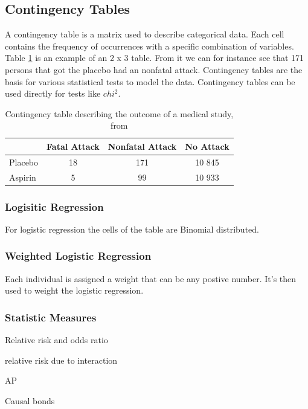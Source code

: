 \documentclass[10pt,a4paper]{article}
\begin{document}
\subsection{Contingency Tables}
A contingency table is a matrix used to describe categorical data. Each cell contains the frequency of occurrences with a specific combination of variables. Table \ref{table:contingency_table} is an example of an 2 x 3 table. From it we can for instance see that 171 persons that got the placebo had an nonfatal attack. Contingency tables are the basis for various statistical tests to model the data. Contingency tables can be used directly for tests like $chi^2$.\cite{agresti_categorical}

\begin{table}[h]
\begin{tabular}{ l c c c }
  \hline
  & Fatal Attack & Nonfatal Attack & No Attack\\
  \hline
  Placebo & 18 & 171 & 10 845 \\
  Aspirin & 5 & 99 & 10 933 \\
  \hline  
\end{tabular}
\caption{Contingency table describing the outcome of a medical study, from \cite{agresti_categorical}}
\label{table:contingency_table}
\end{table}

\subsubsection{Logisitic Regression}
For logistic regression the cells of the table are Binomial distributed.\cite{agresti_categorical}

\subsubsection{Weighted Logistic Regression}
Each individual is assigned a weight that can be any postive number. It's then used to weight the logistic regression.

\subsubsection{Statistic Measures}
Relative risk and odds ratio\cite{agresti_categorical}

relative risk due to interaction

AP

Causal bonds\cite{causal_bounds_arvid}

\end{document}
